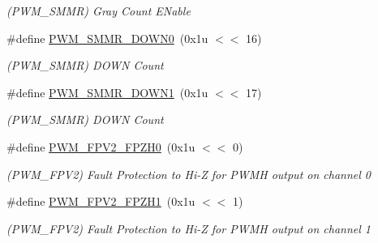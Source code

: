 \begin{DoxyCompactItemize}
\begin{DoxyCompactList}\small\item\em (P\+W\+M\+\_\+\+S\+M\+MR) Gray Count E\+Nable \end{DoxyCompactList}\item 
\mbox{\label{group__SAME70__PWM_ga761056425aa02bd82bc39edfd3c0be2a}} 
\#define \mbox{\hyperlink{group__SAME70__PWM_ga761056425aa02bd82bc39edfd3c0be2a}{P\+W\+M\+\_\+\+S\+M\+M\+R\+\_\+\+D\+O\+W\+N0}}~(0x1u $<$$<$ 16)
\begin{DoxyCompactList}\small\item\em (P\+W\+M\+\_\+\+S\+M\+MR) D\+O\+WN Count \end{DoxyCompactList}\item 
\mbox{\label{group__SAME70__PWM_ga9fac8e2f4988eb9487755679b524baea}} 
\#define \mbox{\hyperlink{group__SAME70__PWM_ga9fac8e2f4988eb9487755679b524baea}{P\+W\+M\+\_\+\+S\+M\+M\+R\+\_\+\+D\+O\+W\+N1}}~(0x1u $<$$<$ 17)
\begin{DoxyCompactList}\small\item\em (P\+W\+M\+\_\+\+S\+M\+MR) D\+O\+WN Count \end{DoxyCompactList}\item 
\mbox{\label{group__SAME70__PWM_gaf40bdd04578cb341f6d6d1f02db82135}} 
\#define \mbox{\hyperlink{group__SAME70__PWM_gaf40bdd04578cb341f6d6d1f02db82135}{P\+W\+M\+\_\+\+F\+P\+V2\+\_\+\+F\+P\+Z\+H0}}~(0x1u $<$$<$ 0)
\begin{DoxyCompactList}\small\item\em (P\+W\+M\+\_\+\+F\+P\+V2) Fault Protection to Hi-\/Z for P\+W\+MH output on channel 0 \end{DoxyCompactList}\item 
\mbox{\label{group__SAME70__PWM_ga00852771fbfc71aff94b61036421cef2}} 
\#define \mbox{\hyperlink{group__SAME70__PWM_ga00852771fbfc71aff94b61036421cef2}{P\+W\+M\+\_\+\+F\+P\+V2\+\_\+\+F\+P\+Z\+H1}}~(0x1u $<$$<$ 1)
\begin{DoxyCompactList}\small\item\em (P\+W\+M\+\_\+\+F\+P\+V2) Fault Protection to Hi-\/Z for P\+W\+MH output on channel 1 \end{DoxyCompactList}\item 
\mbox{\label{group__SAME70__PWM_gabdd5ede76d1d9f0eb5df161a76c9aa33}} 

\end{DoxyCompactItemize}
